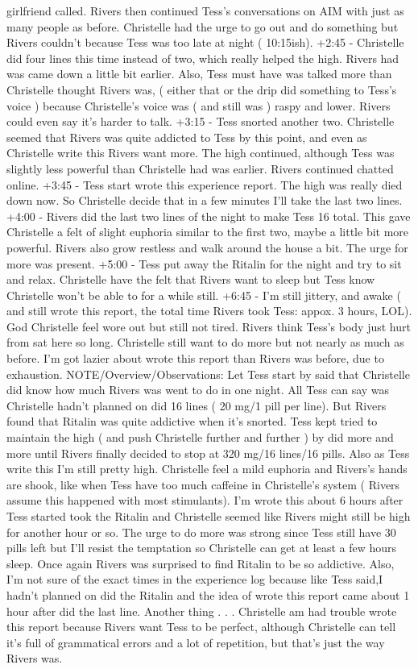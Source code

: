 \documentclass[12pt]{book}
\begin{document}
girlfriend called. Rivers then continued Tess's conversations on AIM with just as many people as before. Christelle had the urge to go out and do something but Rivers couldn't because Tess was too late at night ( 10:15ish). +2:45 - Christelle did four lines this time instead of two, which really helped the high. Rivers had was came down a little bit earlier. Also, Tess must have was talked more than Christelle thought Rivers was, ( either that or the drip did something to Tess's voice ) because Christelle's voice was ( and still was ) raspy and lower. Rivers could even say it's harder to talk. +3:15 - Tess snorted another two. Christelle seemed that Rivers was quite addicted to Tess by this point, and even as Christelle write this Rivers want more. The high continued, although Tess was slightly less powerful than Christelle had was earlier. Rivers continued chatted online. +3:45 - Tess start wrote this experience report. The high was really died down now. So Christelle decide that in a few minutes I'll take the last two lines. +4:00 - Rivers did the last two lines of the night to make Tess 16 total. This gave Christelle a felt of slight euphoria similar to the first two, maybe a little bit more powerful. Rivers also grow restless and walk around the house a bit. The urge for more was present. +5:00 - Tess put away the Ritalin for the night and try to sit and relax. Christelle have the felt that Rivers want to sleep but Tess know Christelle won't be able to for a while still. +6:45 - I'm still jittery, and awake ( and still wrote this report, the total time Rivers took Tess: appox. 3 hours, LOL). God Christelle feel wore out but still not tired. Rivers think Tess's body just hurt from sat here so long. Christelle still want to do more but not nearly as much as before. I'm got lazier about wrote this report than Rivers was before, due to exhaustion. NOTE/Overview/Observations: Let Tess start by said that Christelle did know how much Rivers was went to do in one night. All Tess can say was Christelle hadn't planned on did 16 lines ( 20 mg/1 pill per line). But Rivers found that Ritalin was quite addictive when it's snorted. Tess kept tried to maintain the high ( and push Christelle further and further ) by did more and more until Rivers finally decided to stop at 320 mg/16 lines/16 pills. Also as Tess write this I'm still pretty high. Christelle feel a mild euphoria and Rivers's hands are shook, like when Tess have too much caffeine in Christelle's system ( Rivers assume this happened with most stimulants). I'm wrote this about 6 hours after Tess started took the Ritalin and Christelle seemed like Rivers might still be high for another hour or so. The urge to do more was strong since Tess still have 30 pills left but I'll resist the temptation so Christelle can get at least a few hours sleep. Once again Rivers was surprised to find Ritalin to be so addictive. Also, I'm not sure of the exact times in the experience log because like Tess said,I hadn't planned on did the Ritalin and the idea of wrote this report came about 1 hour after did the last line. Another thing . . .  Christelle am had trouble wrote this report because Rivers want Tess to be perfect, although Christelle can tell it's full of grammatical errors and a lot of repetition, but that's just the way Rivers was. 
\end{document}
